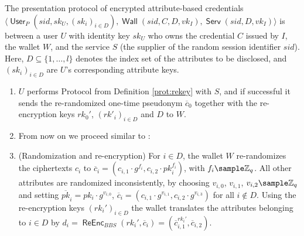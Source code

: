 \documentclass[runningheads]{llncs}
\newcommand{\Z}{\mathbb{Z}}
\DeclareMathOperator{\user}{\mathsf{User}}
\DeclareMathOperator{\wallet}{\mathsf{Wall}}
\DeclareMathOperator{\service}{\mathsf{Serv}}
\DeclareMathOperator{\PRE}{\ensuremath{\mathsf{PRE}}}
\DeclareMathOperator{\ZKP}{\ensuremath{\mathsf{ZKP}}}
\DeclareMathOperator{\reenc}{\mathsf{ReEnc}}
\begin{document}
\begin{definition}
\label{prot:presentation}
The presentation protocol of encrypted attribute-based credentials $\big\langle \user_P(sid, sk_U, (sk_i)_{i\in D}), \wallet(sid, C, D,vk_I), \service(sid, D, vk_I)\big\rangle$ 
is between a user $U$ with identity key $sk_U$ who owns the credential $C$ issued by $I$, the wallet $W$, and the service $S$ (the supplier of the random session identifier $sid$).
Here, $D\subseteq\{1,\ldots,l\}$ denotes the index set of the attributes to be disclosed, and $(sk_i)_{i\in D}$ are $U$'s corresponding attribute keys.
\begin{enumerate}
\item
$U$ performs Protocol  from Definition \ref{prot:rekey} with $S$, and if successful it sends the re-randomized one-time pseudonym $\overline c_0$ together with the re-encryption keys $rk_0'$, $\left(rk'_i\right)_{i\in D}$ and $D$ to $W$.



\medskip
\item[]{From now on we proceed similar to \cite{towardsEABC}:}
\item
(Randomization and re-encryption) For $i\in D$, the wallet $W$ re-randomizes the ciphertexts $c_i$ to $\overline c_i =  \left(c_{i,1}\cdot g^{f_i}, c_{i,2}\cdot pk_i^{f_i}\right)$, with $f_i\sample\Z_q$. 
All other attributes are randomized inconsistently, by choosing  $v_{i,0}$, $v_{i,1}$, $v_{i,2}\sample\Z_q$ and setting $\overline{pk}_i = pk_i \cdot g^{v_{i,0}}$, $\overline c_i = \left(c_{i,1} \cdot g^{v_{i,1}}, c_{i,2}\cdot g^{v_{i,3}}\right)$ for all $i\not\in D$.
Using the re-encryption keys $\left(rk_i'\right)_{i\in D}$ the wallet translates the attributes belonging to $i\in D$ by $d_i =\reenc_{BBS}\left(rk_i', \overline c_i\right) =\left(\overline c_{i,1}^{rk_i'}, \overline c_{i,2}\right)$.


\end{enumerate}
\end{definition}
\end{document}
